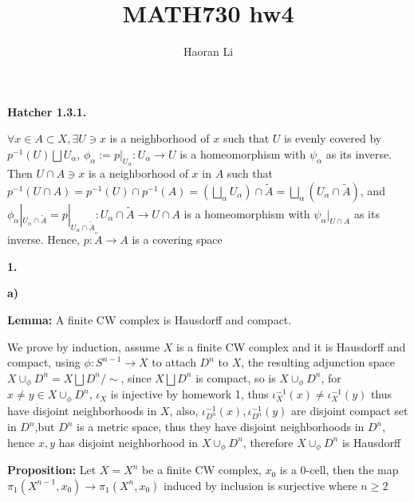 \documentclass[12pt]{article}
\title{MATH730 hw4}
\author{Haoran Li}
\date{}
\begin{document}
\maketitle
\textbf{Hatcher 1.3.1.} \par
$\forall x\in A\subset X, \exists U\ni x$ is a neighborhood of $x$ such that $U$ is evenly covered by $p^{-1}(U)\bigsqcup U_{\alpha}$, $\phi_{\alpha}:=p|_{U_{\alpha}}:U_{\alpha}\rightarrow U$ is a homeomorphism with $\psi_{\alpha}$ as its inverse. Then $U\cap A\ni x$ is a neighborhood of $x$ in $A$ such that $\displaystyle{p^{-1}(U\cap A)=p^{-1}(U)\cap p^{-1}(A)=\left(\underset{\alpha}{\bigsqcup}U_{\alpha}\right)\cap \widetilde{A}}=\underset{\alpha}{\bigsqcup}\left(U_{\alpha}\cap \widetilde{A}\right)$, and $\phi_{\alpha}|_{U_{\alpha}\cap \widetilde{A}}=p|_{U_{\alpha}\cap \widetilde{A}}: U_{\alpha}\cap \widetilde{A}\rightarrow U\cap A$ is a homeomorphism with $\psi_{\alpha}|_{U\cap A}$ as its inverse. Hence, $p: \widetilde{A}\rightarrow A$ is a covering space \par
\textbf{1.} \par
\textbf{a)} \par
\textbf{Lemma:} A finite CW complex is Hausdorff and compact. \par
We prove by induction, assume $X$ is a finite CW complex and it is Hausdorff and compact, using $\phi: S^{n-1}\rightarrow X$ to attach $D^{n}$ to $X$, the resulting adjunction space $X\cup_{\phi}D^{n}=X\bigsqcup D^{n} /\sim$, since $X\bigsqcup D^{n}$ is compact, so is $X\cup_{\phi}D^{n}$, for $x\neq y\in X\cup_{\phi}D^{n}$, $\iota_{X}$ is injective by homework 1, thus $\iota_{X}^{-1}(x)\neq\iota_{X}^{-1}(y)$ thus have disjoint neighborhoods in $X$, also, $\iota_{D^{n}}^{-1}(x),\iota_{D^{n}}^{-1}(y)$ are disjoint compact set in $D^{n}$,but $D^{n}$ is a metric space, thus they have disjoint neighborhoods in $D^{n}$, hence $x,y$ has disjoint neighborhood in $X\cup_{\phi}D^{n}$, therefore $X\cup_{\phi}D^{n}$ is Hausdorff
\begin{center}
\end{center}
\textbf{Proposition:} Let $X=X^{n}$ be a finite CW complex, $x_{0}$ is a \(0\)-cell, then the map $\pi_{1}(X^{n-1},x_{0})\rightarrow\pi_{1}(X^{n},x_{0})$ induced by inclusion is surjective where $n\geq 2$ \par
\end{document}
